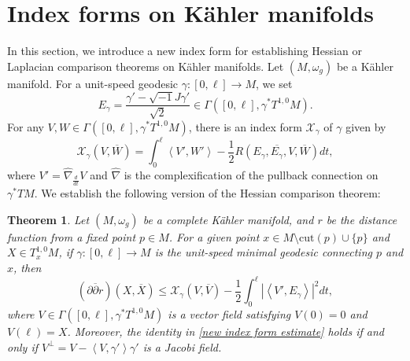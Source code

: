 \documentclass[12pt,reqno]{amsart}
\newcommand\cX{{\mathcal X}}
\newcommand\bp{{\bar\partial}}
\theoremstyle{plain}
\newtheorem{thm}{Theorem}[section]
\theoremstyle{definition}
\newcommand{\btheorem}{\begin{thm}}
\newcommand{\etheorem}{\end{thm}}
\newcommand{\sq}{\sqrt{-1}}
\newcommand{\p}{\partial}
\renewcommand{\bar}{\overline}
\newcommand{\beq}{\begin{equation}}
\newcommand{\eeq}{\end{equation}}
\renewcommand{\hat}{\widehat}
\renewcommand{\bp}{\bar{\partial}}
\renewcommand{\>}{\rightarrow}
\newcommand{\LL}{\left\langle}
\newcommand{\RL}{\right\rangle}
\numberwithin{equation}{section} %
\newcommand{\om}{\omega}
\renewcommand{\le}{\leqslant}
\begin{document}
\section{Index forms on K\"ahler manifolds}
In this section, we introduce a new index form for establishing Hessian or Laplacian comparison theorems on K\"ahler manifolds.
Let $(M,\om_g)$ be a K\"ahler manifold.
For a unit-speed geodesic $\gamma:[0,\ell]\to M$,  we set \beq E_\gamma=\frac{\gamma'-\sq J\gamma'}{\sqrt{2}} \in \Gamma\left([0,\ell], \gamma^*T^{1,0}M\right).\eeq
For any $V,W\in \Gamma\left([0,\ell],\gamma^*T^{1,0}M\right)$,  there is  an index form $\cX_\gamma$ of $\gamma$ given by
\beq
    \cX_\gamma\left(V,\bar W\right)=\int_0^\ell \LL V',W'\RL-\frac{1}{2}R\left(E_\gamma,\bar{E_\gamma},V,\bar W\right)dt,\label{new index form X}
\eeq
where $V'=\hat\nabla_{\frac{d}{dt}}V$ and $\hat\nabla$ is the complexification of the pullback connection on $\gamma^*TM$.
We establish the following version of the Hessian comparison theorem:
\btheorem \label{thm new index}
    Let $(M,\om_g)$ be a complete K\"ahler manifold, and $r$ be the distance function from a fixed point $p\in M$.
    For a given point $x\in M\setminus \mathrm{cut}(p)\cup \{p\}$ and $X\in T_x^{1,0}M$,  if  $\gamma:[0,\ell]\to M$ is the unit-speed minimal geodesic connecting $p$ and $x$, then
    \beq
        \left(\p\bp r\right)\left(X,\bar X\right)\le \cX_\gamma\left(V,\bar V\right)-\frac{1}{2}\int_0^\ell \left|\LL V',E_\gamma\RL\right|^2dt,\label{new index form estimate}
    \eeq
    where $V\in \Gamma([0,\ell],\gamma^*T^{1,0}M)$ is a  vector field  satisfying $V(0)=0$ and $V(\ell)=X$.  Moreover, the identity in \eqref{new index form estimate} holds if and only if $V^\perp=V-\LL V,\gamma'\RL\gamma'$ is a  Jacobi field.
\etheorem
\end{document}
